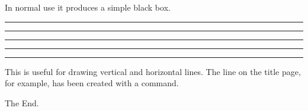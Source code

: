 \noindent In normal use it produces a simple black box.

\begin{example}
\rule{3mm}{.1pt}%
\rule[-1mm]{5mm}{1cm}%
\rule{3mm}{.1pt}%
\rule[1mm]{1cm}{5mm}%
\rule{3mm}{.1pt}
\end{example}

\noindent This is useful for drawing vertical and horizontal
lines. The line on the title page, for example, has been created with a
 command.

\bigskip
\begin{FlushRight}
  The End.
\end{FlushRight}

%


